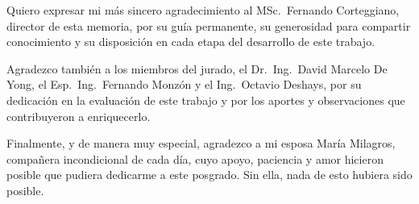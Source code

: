 \documentclass[
    11pt,
    spanish,
    singlespacing,
    parskip,
    headsepline,
    openany,
    bookmarks=true,
    unicode=true,
    pdftoolbar=true,
    pdfmenubar=true,
    pdffitwindow=false,
    colorlinks=true,
    linkcolor=blue,
    citecolor=blue,
    urlcolor=blue
]{MastersDoctoralThesis}
\begin{document}



\frontmatter %
\pagestyle{plain} %


\begin{abstract}
\addchaptertocentry{\abstractname} %
En la presente memoria se describe el desarrollo de un sistema inteligente y personalizado para la optimización de parámetros biomecánicos de una bicicleta. Este trabajo pretende maximizar la eficiencia del pedaleo y minimizar el riesgo de lesiones, con el fin de democratizar el acceso a una biomecánica de precisión con un bajo costo. Para su implementación fueron esenciales los conocimientos en detección de pose por redes neuronales, análisis cinemático y algoritmos de optimización multiobjetivo.
\end{abstract}


\begin{acknowledgements}
\vspace{1.5cm}

Quiero expresar mi más sincero agradecimiento al MSc.\ Fernando Corteggiano,
director de esta memoria, por su guía permanente, su generosidad para
compartir conocimiento y su disposición en cada etapa del desarrollo de
este trabajo.

Agradezco también a los miembros del jurado, el Dr.\ Ing.\ David Marcelo
De Yong, el Esp.\ Ing.\ Fernando Monzón y el
Ing.\ Octavio Deshays, por su dedicación en la evaluación de este
trabajo y por los aportes y observaciones que contribuyeron a enriquecerlo.

Finalmente, y de manera muy especial, agradezco a mi esposa María Milagros,
compañera incondicional de cada día, cuyo apoyo, paciencia y amor hicieron
posible que pudiera dedicarme a este posgrado. Sin ella, nada de esto
hubiera sido posible.

\end{acknowledgements}
\end{document}
